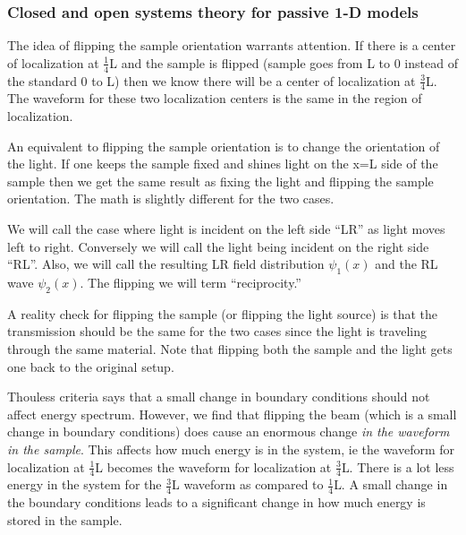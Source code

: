 \subsubsection {Closed and open systems theory for passive 1-D models}

The idea of flipping the sample orientation warrants
attention.  If there is a center of localization
at $ \frac{1}{4} $L and
the sample is flipped (sample goes from L to 0 instead
of the standard 0 to L) then we know there will be a center
of localization at $ \frac{3}{4} $L.  The waveform for
these two localization centers is the same in the region
of localization.

An equivalent to flipping the sample orientation is
to change the orientation of the light.  If one keeps
the sample fixed and shines light on the x=L side of the
sample then we get the same result as fixing the light and
flipping the sample orientation.  The math is slightly
different for the two cases. %

We will call the case where light is incident on the left side ``LR''
as light moves left to right. Conversely we will call the
light being incident on the right side ``RL''.  Also,
we will call the resulting LR field 
distribution $ \psi _1(x) $ and the RL wave $ \psi  _2(x) $. 
The flipping we will term ``reciprocity.'' 

A reality check for flipping the sample (or flipping the
light source) is that the transmission should be the same for the
two cases since the light is traveling through the
same material.  Note that flipping both the sample and the
light gets one back to the original setup.

Thouless criteria says that a small change in boundary
conditions should not affect energy spectrum. However, we 
find that flipping the beam (which is a small change
in boundary conditions) does cause an enormous 
change {\it in the waveform in the sample}. This  affects
how much energy is in the system, ie the waveform for
localization at $ \frac{1}{4} $L becomes the
waveform for localization at $ \frac{3}{4} $L.
There is a lot less energy in the system for the
$ \frac{3}{4} $L waveform as compared to $ \frac{1}{4} $L. A
small change in the boundary conditions leads to
a significant change in how much energy is stored
in the sample.

